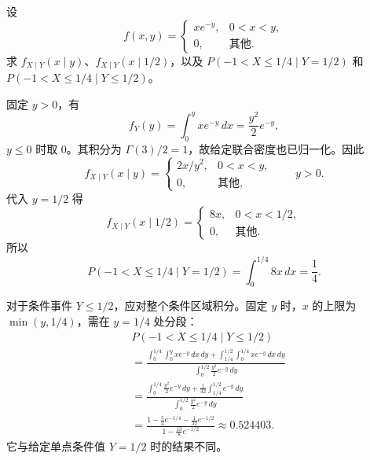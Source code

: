 \begin{example}[固定条件值与区间条件事件]
设
\[
f(x,y)=
\begin{cases}
xe^{-y},&0<x<y,\\
0,&\text{其他}.
\end{cases}
\]
求 $f_{X\mid Y}(x\mid y)$、$f_{X\mid Y}(x\mid1/2)$，以及
$P(-1<X\leq1/4\mid Y=1/2)$ 和 $P(-1<X\leq1/4\mid Y\leq1/2)$。

固定 $y>0$，有
\[
f_Y(y)=\int_0^yxe^{-y}\,dx=\frac{y^2}2e^{-y},
\]
$y\leq0$ 时取 $0$。其积分为 $\Gamma(3)/2=1$，故给定联合密度也已归一化。因此
\[
f_{X\mid Y}(x\mid y)=
\begin{cases}
2x/y^2,&0<x<y,\\
0,&\text{其他},
\end{cases}\qquad y>0.
\]
代入 $y=1/2$ 得
\[
f_{X\mid Y}(x\mid1/2)=
\begin{cases}
8x,&0<x<1/2,\\
0,&\text{其他}.
\end{cases}
\]
所以
\[
P(-1<X\leq1/4\mid Y=1/2)=\int_0^{1/4}8x\,dx=\frac14.
\]

对于条件事件 $Y\leq1/2$，应对整个条件区域积分。固定 $y$ 时，$x$ 的上限为 $\min(y,1/4)$，需在 $y=1/4$ 处分段：
\begin{align*}
&P(-1<X\leq1/4\mid Y\leq1/2)\\
&=\frac{\displaystyle
 \int_0^{1/4}\int_0^yxe^{-y}\,dx\,dy+
 \int_{1/4}^{1/2}\int_0^{1/4}xe^{-y}\,dx\,dy}
 {\displaystyle\int_0^{1/2}\frac{y^2}2e^{-y}\,dy}\\
&=\frac{\displaystyle
 \int_0^{1/4}\frac{y^2}2e^{-y}\,dy+
 \frac1{32}\int_{1/4}^{1/2}e^{-y}\,dy}
 {\displaystyle\int_0^{1/2}\frac{y^2}2e^{-y}\,dy}\\
&=\frac{1-\frac54e^{-1/4}-\frac1{32}e^{-1/2}}
 {1-\frac{13}8e^{-1/2}}
\approx0.524403.
\end{align*}
它与给定单点条件值 $Y=1/2$ 时的结果不同。
\end{example}

